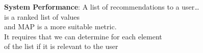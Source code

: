 
    \begin{block}{\textbf{System Performance}: }
        \alert<2>{A list of recommendations to a user\ldots}\\
        \alert<3>{is a ranked list of values} \\
        \alert<4>{and MAP is a more suitable metric.}\\
        \alert<5>{It requires that we can determine for each element}\\
        \alert<6>{of the list if it is relevant to the user}  
    \end{block}